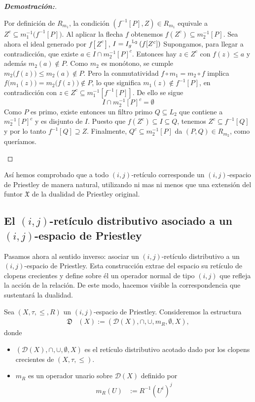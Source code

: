 \documentclass[12pt]{book}
\newcommand{\Ig}{\mathnormal{I_g}}
\newcommand{\D}{\mathfrak{D}}
\begin{document}
\begin{proof}[{\textbf{Demostración:}}]
\begin{itemize}
\begin{enumerate}
Por definición de $R_{m_1}$, la condición $(f^{-1}[P],Z)\in R_{m_1}$ equivale a $Z^c\subseteq m_1^{-1}\bigl(f^{-1}[P]\bigr)$. Al aplicar la flecha $f$ obtenemos $f(Z^c)\subseteq m_2^{-1}[P]$. 
Sea ahora el ideal generado por $f[Z^c]$, $I = \Ig^{\mathbb{L}_{2}}\left( f[Z^c] \right)$ Supongamos, para llegar a contradicción, que existe $a\in I\cap m_2^{-1}[P]^c$. Entonces hay $z\in Z^c$ con $f(z)\le a$ y además $m_2(a)\notin P$. Como $m_2$ es monótono, se cumple $m_2\bigl(f(z)\bigr)\le m_2(a)\notin P$. Pero la conmutatividad $f\circ m_1 = m_2\circ f$ implica $f\bigl(m_1(z)\bigr)=m_2\bigl(f(z)\bigr)\notin P$,  
lo que significa $m_1(z)\notin f^{-1}[P]$, en contradicción con $z\in Z^c\subseteq m_1^{-1}[f^{-1}[P]]$. De ello se sigue  
\[I\cap m_2^{-1}[P]^c=\emptyset\] 
Como $P$ es primo, existe entonces un filtro primo $Q\subseteq L_2$ que contiene a $m_2^{-1}[P]^c$ y es disjunto de $I$. Puesto que $f(Z^c)\subseteq I\subseteq Q$, tenemos $Z^c\subseteq f^{-1}[Q]$ y por lo tanto $f^{-1}[Q]\supseteq Z$. Finalmente, $Q^c\subseteq m_2^{-1}[P]$ da $(P,Q)\in R_{m_2}$, como queríamos.
\end{enumerate}
\end{itemize}
\end{proof}
Así hemos comprobado que a todo $(i,j)$‑retículo corresponde un $(i,j)$‑espacio de Priestley de manera natural, utilizando ni mas ni menos que una extensión del funtor $\mathfrak{X}$ de la dualidad de Priestley original.


\subsection{El $(i,j)$-retículo distributivo asociado a un $(i,j)$-espacio de Priestley}

Pasamos ahora al sentido inverso: asociar un $(i,j)$-retículo distributivo a un $(i,j)$-espacio de Priestley. Esta construcción extrae del espacio su retículo de clopens crecientes y define sobre él un operador normal de tipo $(i, j)$ que refleja la acción de la relación. De este modo, hacemos visible la correspondencia que sustentará la dualidad.


Sea $(X, \tau, \leq, R)$ un $(i,j)$-espacio de Priestley. Consideremos la estructura
\begin{align*}
\D&(X) := (\mathcal{D}(X), \cap, \cup, m_{R} ,\emptyset, X),
\end{align*}
donde
\begin{itemize}
\item $(\mathcal{D}(X), \cap, \cup ,\emptyset, X)$ es el retículo distributivo acotado dado por los clopens crecientes de $(X,\tau,\leq)$.
\item $m_R$ es un operador unario sobre $\mathcal{D}(X)$ definido por 
\begin{align*} m_{R}(U) & := R^{-1}(U^i)^j 
\end{align*}    
\end{itemize}
\end{document}

